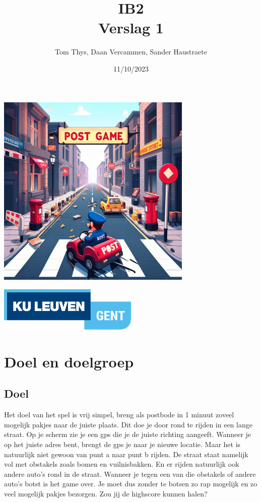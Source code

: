 \documentclass{article}
\title{IB2\\Verslag 1}
\date{11/10/2023}
\author{Tom Thys, Daan Vercammen, Sander Haustraete}
\begin{document}
\maketitle

\begin{minipage}{\textwidth}
    \centering
    \includegraphics[width=0.7\textwidth]{fotos/_a1a1db80-3fb5-41c9-9da6-cb8f494513cb.jpg}
\end{minipage}

\vspace{50pt}

\begin{minipage}{\textwidth}
    \centering
    \includegraphics[width=0.5\textwidth]{fotos/Logo.png}

\end{minipage}

\newpage


\section{Doel en doelgroep}
\subsection{Doel}
Het doel van het spel is vrij simpel, breng als postbode in 1 minuut zoveel mogelijk pakjes naar de juiste plaats. Dit doe je 
door rond te rijden in een lange straat. Op je scherm zie je een gps die je de juiste richting aangeeft. Wanneer je op het juiste adres
bent, brengt de gps je naar je nieuwe locatie. Maar het is natuurlijk niet gewoon van punt a naar punt b rijden. De straat staat namelijk
vol met obstakels zoals bomen en vuilnisbakken. En er rijden natuurlijk ook andere auto's rond in de straat. Wanneer je tegen een van 
die obstakels of andere auto's botst is het game over. Je moet dus zonder te botsen zo rap mogelijk en zo veel mogelijk pakjes 
bezorgen. Zou jij de highscore kunnen halen? 
\end{document}
